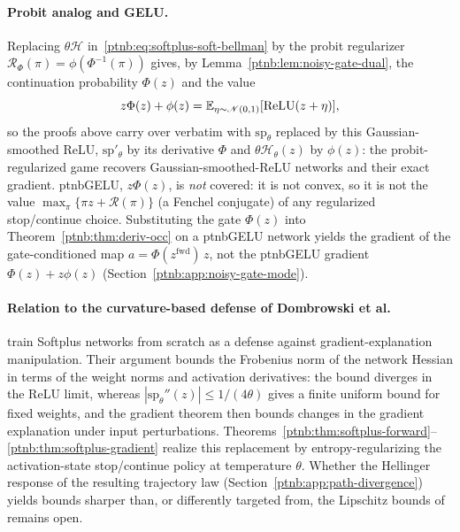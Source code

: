 \paragraph{Probit analog and GELU.}
Replacing $\theta\mathcal{H}$ in~\eqref{ptnb:eq:softplus-soft-bellman} by the probit regularizer
$\mathcal{R}_\Phi(\pi) = \phi(\Phi^{-1}(\pi))$ gives, by Lemma~\ref{ptnb:lem:noisy-gate-dual}, the
continuation probability $\Phi(z)$ and the value
\begin{equation*}
    z\Phi(z) + \phi(z) = \mathbb{E}_{\eta \sim \mathscr{N}(0,1)}[\text{ReLU}(z + \eta)],
\end{equation*}
so the proofs above carry over verbatim with
$\mathrm{sp}_\theta$ replaced by this Gaussian-smoothed ReLU, $\mathrm{sp}'_\theta$ by its
derivative $\Phi$ and $\theta\mathcal{H}_\theta(z)$ by $\phi(z)$: the probit-regularized game
recovers Gaussian-smoothed-ReLU networks and their exact gradient. \acs{ptnbGELU}, $z\Phi(z)$, is
\emph{not} covered: it is not convex, so it is not the value $\max_\pi\{\pi z + \mathcal{R}(\pi)\}$
(a Fenchel conjugate) of any regularized stop/continue choice. Substituting the gate $\Phi(z)$ into
Theorem~\ref{ptnb:thm:deriv-occ} on a \acs{ptnbGELU} network yields the gradient of the gate-conditioned map
$a = \Phi(z^{\mathrm{fwd}})\, z$, not the \acs{ptnbGELU} gradient $\Phi(z) + z\phi(z)$
(Section~\ref{ptnb:app:noisy-gate-mode}).

\paragraph{Relation to the curvature-based defense of Dombrowski et
al.}\label{ptnb:app:softplus-dombrowski}
\textcite{Dombrowski2020} train Softplus networks from scratch as a defense against
gradient-explanation manipulation. Their argument bounds the Frobenius norm of the network Hessian
in terms of the weight norms and activation derivatives: the bound diverges in the ReLU limit,
whereas $|\mathrm{sp}_\theta''(z)| \le 1/(4\theta)$ gives a finite uniform bound for fixed weights,
and the gradient theorem then bounds changes in the gradient explanation under input perturbations.
Theorems~\ref{ptnb:thm:softplus-forward}--\ref{ptnb:thm:softplus-gradient} realize this replacement
by entropy-regularizing the activation-state
stop/continue policy at temperature $\theta$. Whether the Hellinger response of the resulting
trajectory law (Section~\ref{ptnb:app:path-divergence}) yields bounds sharper than, or differently
targeted from, the Lipschitz bounds of \textcite{Dombrowski2020} remains open.
\par\medskip
